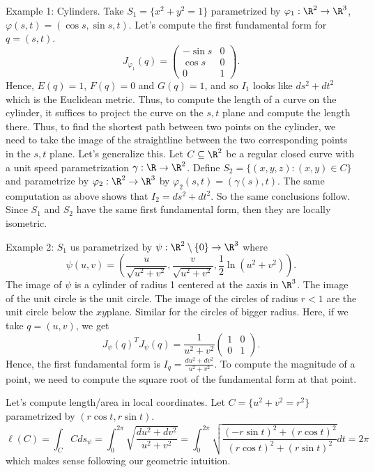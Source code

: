 Example 1: Cylinders. Take $S_1 = \{x^2 + y^2 = 1\}$ parametrized by $\varphi_1 : \R^2 \to \R^3$, $\varphi(s,t) = (\cos s, \sin s, t)$. Let's compute the first fundamental form for $q = (s,t)$.
$$J_{\varphi_1}(q) = \begin{pmatrix}
    -\sin s & 0 \\
    \cos s & 0 \\
    0 & 1
\end{pmatrix}.$$
Hence, $E(q) = 1$, $F(q) = 0$ and $G(q) = 1$, and so $I_1$ looks like $ds^2 + dt^2$ which is the Euclidean metric. Thus, to compute the length of a curve on the cylinder, it suffices to project the curve on the $s,t$ plane and compute the length there. Thus, to find the shortest path between two points on the cylinder, we need to take the image of the straightline between the two corresponding points in the $s,t$ plane. Let's generalize this. Let $C \subseteq \R^2$ be a regular closed curve with a unit speed parametrization $\gamma : \R \to \R^2$. Define $S_2 = \{(x,y,z) : (x,y) \in C\}$ and parametrize by $\varphi_2 : \R^2 \to \R^3$ by $\varphi_2(s,t) = (\gamma(s), t)$. The same computation as above shows that $I_2 = ds^2 + dt^2$. So the same conclusions follow. Since $S_1$ and $S_2$ have the same first fundamental form, then they are locally isometric.

Example 2: $S_1$ us parametrized by $\psi : \R^2 \setminus \{0\} \to \R^3$ where
$$\psi(u,v) = \left(\frac{u}{\sqrt{u^2+v^2}}, \frac{v}{\sqrt{u^2+v^2}}, \frac{1}{2}\ln(u^2 + v^2)\right).$$
The image of $\psi$ is a cylinder of radius 1 centered at the $z$axis in $\R^3$. The image of the unit circle is the unit circle. The image of the circles of radius $r < 1$ are the unit circle below the $xy$plane. Similar for the circles of bigger radius. Here, if we take $q = (u,v)$, we get
$$J_{\psi}(q)^TJ_{\psi}(q) = \frac{1}{u^2 + v^2}\begin{pmatrix}
    1 & 0 \\ 0 & 1
\end{pmatrix}.$$
Hence, the first fundamental form is $I_q = \frac{du^2 + dv^2}{u^2 + v^2}$. To compute the magnitude of a point, we need to compute the square root of the fundamental form at that point.

Let's compute length/area in local coordinates. Let $C = \{u^2 + v^2 = r^2\}$ parametrized by $(r\cos t, r\sin t)$.
$$\ell(C) = \int_C Cds_{\psi} = \int_{0}^{2\pi}\sqrt{\frac{du^2 + dv^2}{u^2 + v^2}} = \int_{0}^{2\pi}\sqrt{\frac{(-r\sin t)^2 + (r\cos t)^2}{(r\cos t)^2 + (r\sin t)^2}}dt = 2\pi$$
which makes sense following our geometric intuition. \\

